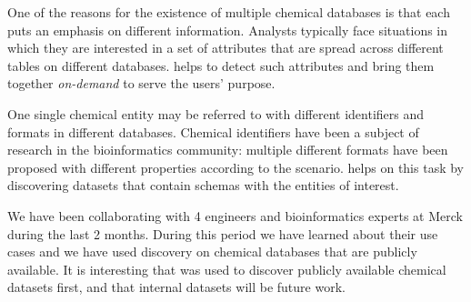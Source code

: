  One of the reasons for the existence of multiple chemical
databases is that each puts an emphasis on different information. Analysts
typically face situations in which they are interested in a set of attributes
that are spread across different tables on different databases. \dcv helps to
detect such attributes and bring them together \emph{on-demand}  to serve the
users' purpose.

 One single chemical entity may be referred to with
different identifiers and formats in different databases. Chemical identifiers
have been a subject of research in the bioinformatics community: multiple
different formats have been proposed with different properties according to the
scenario. \dcv helps on this task by discovering datasets that contain
schemas with the entities of interest.

We have been collaborating with 4 engineers and bioinformatics experts at Merck
during the last 2 months. During this period we have learned about their use
cases and we have used discovery on chemical databases that are publicly
available. It is interesting that \dcv was used to discover publicly available chemical datasets first, and that internal datasets will be future work.
